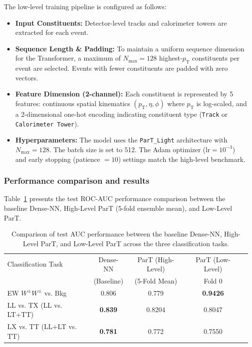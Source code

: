 \documentclass[12pt]{article}
\begin{document}
			The low-level training pipeline is configured as follows:
			\begin{itemize}
				\item \textbf{Input Constituents:} Detector-level tracks and calorimeter towers are extracted for each event.
				\item \textbf{Sequence Length \& Padding:} To maintain a uniform sequence dimension for the Transformer, a maximum of $N_{\text{max}} = 128$ highest-$p_{\text{T}}$ constituents per event are selected. Events with fewer constituents are padded with zero vectors.
				\item \textbf{Feature Dimension (2-channel):} Each constituent is represented by 5 features: continuous spatial kinematics $(p_{\text{T}}, \eta, \phi)$ where $p_{\text{T}}$ is log-scaled, and a 2-dimensional one-hot encoding indicating constituent type (\texttt{Track} or \texttt{Calorimeter Tower}).
				\item \textbf{Hyperparameters:} The model uses the \texttt{ParT\_Light} architecture with $N_{\text{max}} = 128$. The batch size is set to 512. The Adam optimizer ($\text{lr} = 10^{-3}$) and early stopping (patience $= 10$) settings match the high-level benchmark.
			\end{itemize}


        \subsubsection{Performance comparison and results}%
        \label{subs:performance_comparison_and_results}

			Table~\ref{tab:part_low_level_comparison_results} presents the test ROC-AUC performance comparison between the baseline Dense-NN, High-Level ParT (5-fold ensemble mean), and Low-Level ParT.

			\begin{table}[htbp]
				\centering
				\caption{Comparison of test AUC performance between the baseline Dense-NN, High-Level ParT, and Low-Level ParT across the three classification tasks.}
				\label{tab:part_low_level_comparison_results}
				\begin{tabular}{l|c|c|cc}
					\hline
					\hline
					Classification Task & Dense-NN & ParT (High-Level) & ParT (Low-Level) \\
					& (Baseline) & (5-Fold Mean) &  Fold 0 \\
					\hline
					EW $W^\pm W^\pm$ vs. Bkg & 0.806 & 0.779 &            \textbf{0.9426} \\
					LL vs. TX (LL vs. LT+TT) & \textbf{0.839} & 0.8204 &  0.8047 \\
					LX vs. TT (LL+LT vs. TT) & \textbf{0.781} & 0.772 &   0.7550 \\
					\hline
					\hline
				\end{tabular}
			\end{table}
\end{document}
